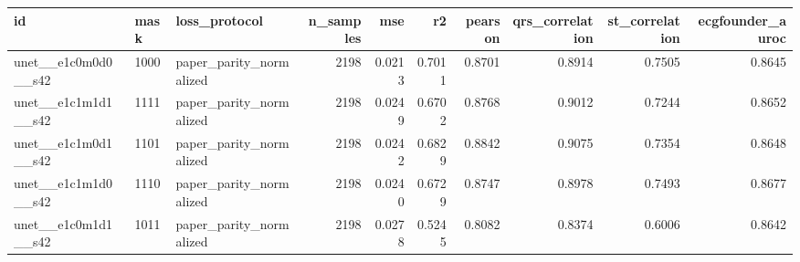 \begin{tabular}{lllrrrrrrr}
\toprule
id & mask & loss_protocol & n_samples & mse & r2 & pearson & qrs_correlation & st_correlation & ecgfounder_auroc \\
\midrule
unet__e1c0m0d0__s42 & 1000 & paper_parity_normalized & 2198 & 0.0213 & 0.7011 & 0.8701 & 0.8914 & 0.7505 & 0.8645 \\
unet__e1c1m1d1__s42 & 1111 & paper_parity_normalized & 2198 & 0.0249 & 0.6702 & 0.8768 & 0.9012 & 0.7244 & 0.8652 \\
unet__e1c1m0d1__s42 & 1101 & paper_parity_normalized & 2198 & 0.0242 & 0.6829 & 0.8842 & 0.9075 & 0.7354 & 0.8648 \\
unet__e1c1m1d0__s42 & 1110 & paper_parity_normalized & 2198 & 0.0240 & 0.6729 & 0.8747 & 0.8978 & 0.7493 & 0.8677 \\
unet__e1c0m1d1__s42 & 1011 & paper_parity_normalized & 2198 & 0.0278 & 0.5245 & 0.8082 & 0.8374 & 0.6006 & 0.8642 \\
\bottomrule
\end{tabular}
